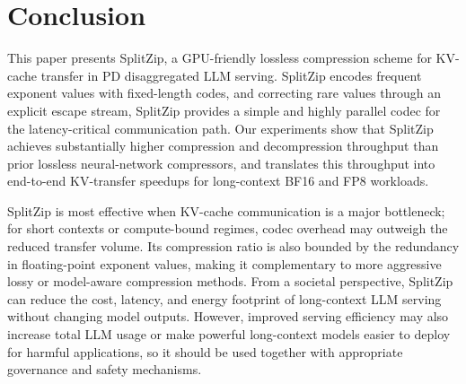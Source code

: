 \section{Conclusion}
\label{sec:conclusion}

This paper presents SplitZip, a GPU-friendly lossless compression scheme for KV-cache transfer in PD disaggregated LLM serving.
SplitZip encodes frequent exponent values with fixed-length codes, and correcting rare values through an explicit escape stream, SplitZip provides a simple and highly parallel codec for the latency-critical communication path.
Our experiments show that SplitZip achieves substantially higher compression and decompression throughput than prior lossless neural-network compressors, and translates this throughput into end-to-end KV-transfer speedups for long-context BF16 and FP8 workloads.

SplitZip is most effective when KV-cache communication is a major bottleneck; for short contexts or compute-bound regimes, codec overhead may outweigh the reduced transfer volume.
Its compression ratio is also bounded by the redundancy in floating-point exponent values, making it complementary to more aggressive lossy or model-aware compression methods.
From a societal perspective, SplitZip can reduce the cost, latency, and energy footprint of long-context LLM serving without changing model outputs.
However, improved serving efficiency may also increase total LLM usage or make powerful long-context models easier to deploy for harmful applications, so it should be used together with appropriate governance and safety mechanisms.